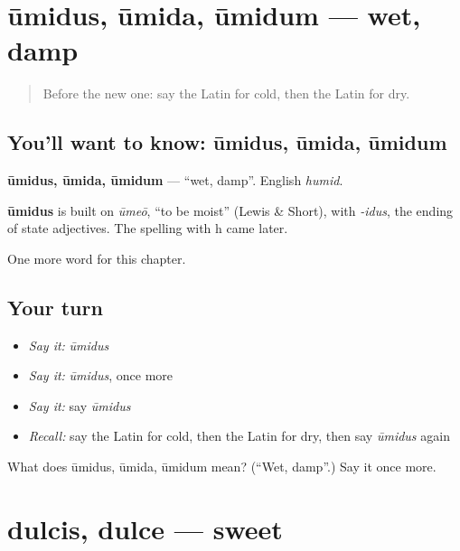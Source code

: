 \section[ūmidus, ūmida, ūmidum]{ūmidus, ūmida, ūmidum — wet, damp}

\label{lesson:LA-C95-umidus}



\begin{quote}
Before the new one: say the Latin for cold, then the Latin for dry.
\end{quote}

\subsection*{You'll want to know: ūmidus, ūmida, ūmidum}
\textbf{ūmidus, ūmida, ūmidum} — \textquotedblleft{}wet, damp\textquotedblright{}. English \emph{humid}.

\begin{cousinweb}
\textbf{ūmidus} is built on \emph{ūmeō}, \textquotedblleft{}to be moist\textquotedblright{} (Lewis \& Short), with \emph{-idus}, the ending of state adjectives. The spelling with h came later.
\end{cousinweb}

\begin{grammarlens}[title={What you've built}]
One more word for this chapter.
\end{grammarlens}

\subsection*{Your turn}
\begin{itemize}
\raggedright
  \item \emph{Say it:} \emph{ūmidus}
  \item \emph{Say it:} \emph{ūmidus}, once more
  \item \emph{Say it:} say \emph{ūmidus}
  \item \emph{Recall:} say the Latin for cold, then the Latin for dry, then say \emph{ūmidus} again
\end{itemize}

\begin{tcolorbox}[breakable,colback=teal!4,colframe=teal!35!black,title={Before you move on}]
What does ūmidus, ūmida, ūmidum mean? (\textquotedblleft{}Wet, damp\textquotedblright{}.) Say it once more.
\end{tcolorbox}
\section[dulcis, dulce]{dulcis, dulce — sweet}

